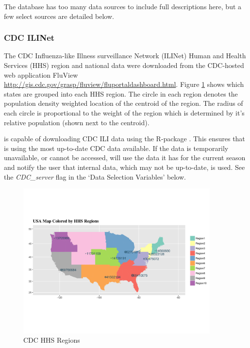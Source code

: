 \documentclass[a4paper]{article}
\begin{document}
The  database has too many data sources to include full descriptions here, but a few select sources are detailed below.

\subsubsection{CDC ILINet}
The CDC Influenza-like Illness surveillance Network (ILINet) Human and Health Services (HHS) region and national data were downloaded from the CDC-hosted web application FluView \url{http://gis.cdc.gov/grasp/fluview/fluportaldashboard.html}.  Figure \ref{fig:CDCregs} shows which states are grouped into each HHS region.  The circle in each region denotes the population density weighted location of the centroid of the region. The radius of each circle is proportional to the weight of the region which is determined by it's relative population (shown next to the centroid).


 is capable of downloading CDC ILI data using the R-package . This ensures that  is using the most up-to-date CDC data available.  If the data is temporarily unavailable, or cannot be accessed,  will use the data it has for the current season and notify the user that internal data, which may not be up-to-date, is used.  See the \textit{CDC\_server} flag in the `Data Selection Variables' below.
\begin{figure}[htbp]
  \centering
  \includegraphics[width=4.0in]{figures/CDCRegions.png}
  \caption{CDC HHS Regions}
  \label{fig:CDCregs}
\end{figure}
\end{document}
